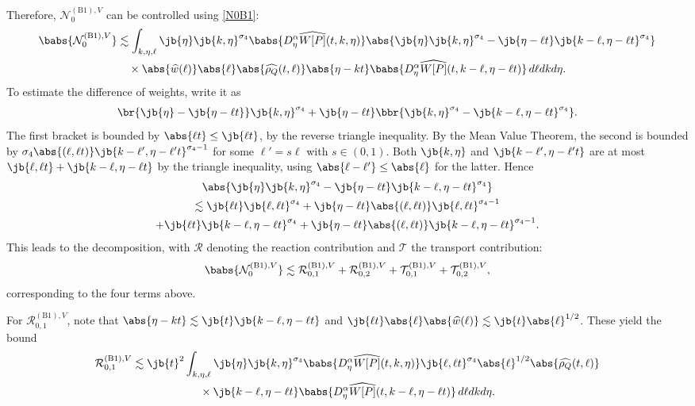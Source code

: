 Therefore, $\mathcal{N}_0^{\mathrm{(B1)},V}$ can be controlled using \eqref{N0B1}:
\begin{multline*}
\babs{\mathcal{N}_0^{\mathrm{(B1)},V}}\lesssim \int_{k,\eta,\ell }\jb{\eta}\jb{k,\eta}^{\sigma_4}\babs{D_\eta^\alpha \widehat{W[P]}(t,k,\eta)}\abs{\jb{\eta}\jb{k,\eta}^{\sigma_4}-\jb{\eta-\ell t}\jb{k-\ell ,\eta-\ell t}^{\sigma_4}}\\
{}\times\abs{\widehat{w}(\ell )}\abs{\ell }\abs{\widehat{\rho_Q}(t,\ell )}\abs{\eta-kt}\babs{D_\eta^\alpha\widehat{W[P]}(t,k-\ell ,\eta-\ell t)}\,d\ell dkd\eta.
\end{multline*}
To estimate the difference of weights, write it as
\begin{align*}
\br{\jb{\eta}-\jb{\eta-\ell t}}\jb{k,\eta}^{\sigma_4}+\jb{\eta-\ell t}\bbr{\jb{k,\eta}^{\sigma_4}-\jb{k-\ell ,\eta-\ell t}^{\sigma_4}}.
\end{align*}
The first bracket is bounded by $\abs{\ell t}\leq\jb{\ell t}$, by the reverse triangle inequality. By the Mean Value Theorem, the second is bounded by $\sigma_4\abs{(\ell,\ell t)}\jb{k-\ell',\eta-\ell't}^{\sigma_4-1}$ for some $\ell'=s\ell$ with $s\in(0,1)$. Both $\jb{k,\eta}$ and $\jb{k-\ell',\eta-\ell't}$ are at most $\jb{\ell,\ell t}+\jb{k-\ell,\eta-\ell t}$ by the triangle inequality, using $\abs{\ell-\ell'}\leq\abs{\ell}$ for the latter. Hence
\begin{multline*}
\abs{\jb{\eta}\jb{k,\eta}^{\sigma_4}-\jb{\eta-\ell t}\jb{k-\ell ,\eta-\ell t}^{\sigma_4}}\\
\lesssim\jb{\ell t}\jb{\ell ,\ell t}^{\sigma_4}+\jb{\eta-\ell t}\abs{(\ell ,\ell t)}\jb{\ell ,\ell t}^{\sigma_4-1}\\
+\jb{\ell t}\jb{k-\ell ,\eta-\ell t}^{\sigma_4}+\jb{\eta-\ell t}\abs{(\ell ,\ell t)}\jb{k-\ell ,\eta-\ell t}^{\sigma_4-1}.
\end{multline*}
This leads to the decomposition, with $\mathcal R$ denoting the reaction contribution and $\mathcal T$ the transport contribution: \[\babs{\mathcal{N}_0^{\mathrm{(B1)},V}}\lesssim \mathcal{R}_{0,1}^{\mathrm{(B1)},V}+\mathcal{R}_{0,2}^{\mathrm{(B1)},V}+\mathcal{T}_{0,1}^{\mathrm{(B1)},V}+\mathcal{T}_{0,2}^{\mathrm{(B1)},V},\] corresponding to the four terms above.

For \(\mathcal{R}_{0,1}^{\mathrm{(B1)},V}\), note that \(\abs{\eta - kt} \lesssim \jb{t} \jb{k - \ell, \eta - \ell t}\) and \(\jb{\ell t} \abs{\ell} \abs{\widehat{w}(\ell)} \lesssim \jb{t} \abs{\ell}^{1/2}\). These yield the bound
\begin{multline*}
\mathcal{R}_{0,1}^{\mathrm{(B1)},V}
\lesssim\jb{t}^2\int_{k,\eta,\ell }\jb{\eta}\jb{k,\eta}^{\sigma_4}\babs{D_\eta^\alpha \widehat{W[P]}(t,k,\eta)}\jb{\ell ,\ell t}^{\sigma_4}\abs{\ell }^{1/2}\abs{\widehat{\rho_Q}(t,\ell )}\\
{}\times\jb{k-\ell ,\eta-\ell t}\babs{D_\eta^\alpha\widehat{W[P]}(t,k-\ell ,\eta-\ell t)}\,d\ell dkd\eta.
\end{multline*}

